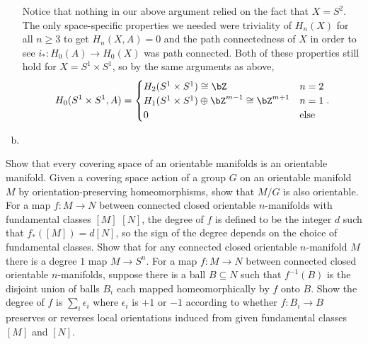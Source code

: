 \begin{homework}[e]
\begin{prf}
\begin{enumerate}[(a)]
      Notice that nothing in our above argument relied on the fact that $X = S^2$. The only space-specific properties we needed were triviality of $H_n(X)$ for all $n \geq 3$ to get $H_n(X,A) = 0$ and the path connectedness of $X$ in order to see $i_*:H_0(A) \to H_0(X)$ was path connected. Both of these properties still hold for $X = S^1\times S^1$, so by the same arguments as above,
      \begin{align*}
        H_0(S^1\times S^1,A) =
        \begin{cases}
          H_2(S^1\times S^1) \cong \bZ & n = 2 \\
          H_1(S^1\times S^1) \oplus \bZ^{m-1} \cong \bZ^{m+1} & n = 1 \\
          0 & \text{else}
        \end{cases}.
      \end{align*}

    \item 
    \end{enumerate}
  \end{prf}
\end{homework}
\begin{homework}[e]
   Show that every covering space of an orientable manifolds is an orientable manifold.
   Given a covering space action of a group $G$ on an orientable manifold $M$ by orientation-preserving homeomorphisms, show that $M/G$ is also orientable.
   For a map $f:M\to N$ between connected closed orientable $n$-manifolds with fundamental classes $[M]$ $[N]$, the degree of $f$ is defined to be the integer $d$ such that $f_*([M]) = d[N]$, so the sign of the degree depends on the choice of fundamental classes. Show that for any connected closed orientable $n$-manifold $M$ there is a degree $1$ map $M\to S^n$.
   For a map $f:M\to N$ between connected closed orientable $n$-manifolds, suppose there is a ball $B \subseteq N$ such that $f^{-1}(B)$ is the disjoint union of balls $B_i$ each mapped homeomorphically by $f$ onto $B$. Show the degree of $f$ is $\sum_i \epsilon_i$ where $\epsilon_i$ is $+1$ or $-1$ according to whether $f:B_i\to B$ preserves or reverses local orientations induced from given fundamental classes $[M]$ and $[N]$.
\end{homework}

